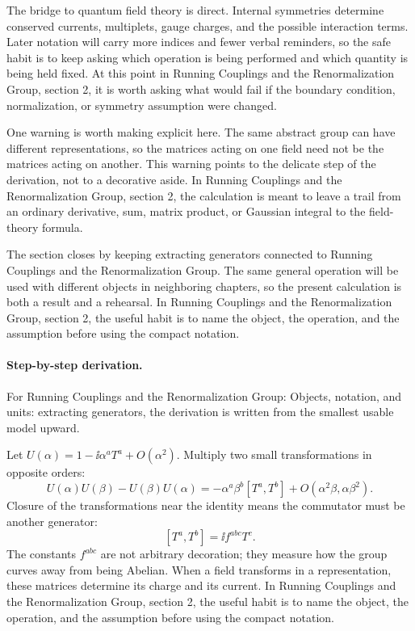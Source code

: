 The bridge to quantum field theory is direct.  Internal symmetries determine conserved currents, multiplets, gauge charges, and the possible interaction terms.  Later notation will carry more indices and fewer verbal reminders, so the safe habit is to keep asking which operation is being performed and which quantity is being held fixed.  At this point in Running Couplings and the Renormalization Group, section 2, it is worth asking what would fail if the boundary condition, normalization, or symmetry assumption were changed.

One warning is worth making explicit here.  The same abstract group can have different representations, so the matrices acting on one field need not be the matrices acting on another.  This warning points to the delicate step of the derivation, not to a decorative aside.  In Running Couplings and the Renormalization Group, section 2, the calculation is meant to leave a trail from an ordinary derivative, sum, matrix product, or Gaussian integral to the field-theory formula.

The section closes by keeping extracting generators connected to Running Couplings and the Renormalization Group.  The same general operation will be used with different objects in neighboring chapters, so the present calculation is both a result and a rehearsal.  In Running Couplings and the Renormalization Group, section 2, the useful habit is to name the object, the operation, and the assumption before using the compact notation.



\paragraph{Step-by-step derivation.}

For Running Couplings and the Renormalization Group: Objects, notation, and units: extracting generators, the derivation is written from the smallest usable model upward.

Let \(U(\alpha)=1-\ii\alpha^aT^a+O(\alpha^2)\).  Multiply two small transformations in opposite orders:
\[
  U(\alpha)U(\beta)-U(\beta)U(\alpha)
  =
  -\alpha^a\beta^b[T^a,T^b]+O(\alpha^2\beta,\alpha\beta^2).
\]
Closure of the transformations near the identity means the commutator must be another generator:
\[
  [T^a,T^b]=\ii f^{abc}T^c.
\]
The constants \(f^{abc}\) are not arbitrary decoration; they measure how the group curves away from being Abelian.  When a field transforms in a representation, these matrices determine its charge and its current.  In Running Couplings and the Renormalization Group, section 2, the useful habit is to name the object, the operation, and the assumption before using the compact notation.

